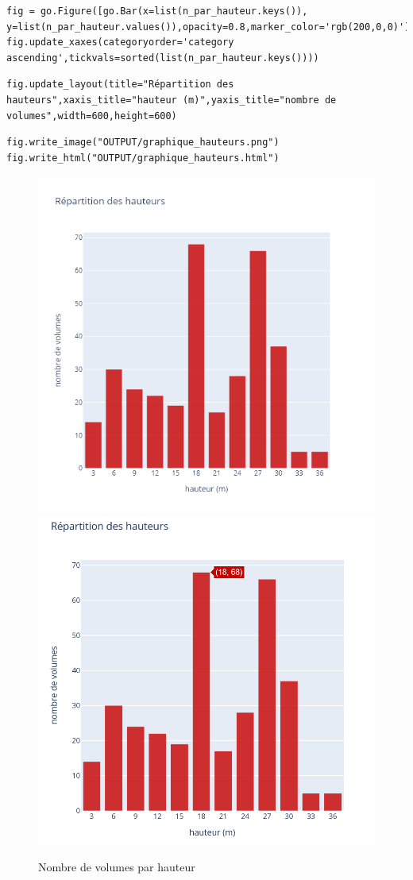 \documentclass[
  11pt,
  french,
]{article}
\begin{document}
\begin{tcolorbox}[title= Moyens d'export et de synthèse des données récoltées ,colback=boitecode]
\begin{lstlisting}[style=code]
fig = go.Figure([go.Bar(x=list(n_par_hauteur.keys()), y=list(n_par_hauteur.values()),opacity=0.8,marker_color='rgb(200,0,0)')])
fig.update_xaxes(categoryorder='category ascending',tickvals=sorted(list(n_par_hauteur.keys())))\end{lstlisting}
\begin{lstlisting}[style=code]
fig.update_layout(title="Répartition des hauteurs",xaxis_title="hauteur (m)",yaxis_title="nombre de volumes",width=600,height=600)\end{lstlisting}
\begin{lstlisting}[style=code]
fig.write_image("OUTPUT/graphique_hauteurs.png")
fig.write_html("OUTPUT/graphique_hauteurs.html")\end{lstlisting}
\end{tcolorbox}

\begin{tcolorbox}
\begin{figure}

{\centering \includegraphics[width=0.45\linewidth]{OUTPUT/graphique_hauteurs} \includegraphics[width=0.45\linewidth]{__imgs/graphique_hauteurs_int} 

}

\caption[Nombre de volumes par hauteur  -  Réalisation personnelle]{Nombre de volumes par hauteur}\label{fig:graph_h}
\end{figure}
\end{tcolorbox}
\end{document}
